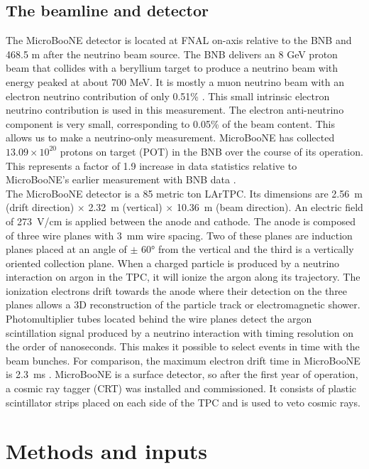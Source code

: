 \documentclass[amsmath,amssymb,aps,prd,showpacs,twocolumn,superscriptaddress,letterpaper,longbibliography, floatfix]{revtex4-2}
\begin{document}
\subsection{The beamline and detector}
The MicroBooNE detector \cite{Microboonedetector} is located at FNAL on-axis relative to the BNB and 468.5 m after the neutrino beam source. The BNB delivers an 8 GeV proton beam that collides with a beryllium target to produce a neutrino beam with energy peaked at about 700 MeV. It is mostly a muon neutrino beam with an electron neutrino contribution of only 0.51\% \cite{MiniBooNEFlux}. This small intrinsic electron neutrino contribution is used in this measurement. The electron anti-neutrino component is very small, corresponding to 0.05\% of the beam content. This allows us to make a neutrino-only measurement. MicroBooNE has collected $13.09\times10^{20}$ protons on target (POT) in the BNB over the course of its operation.  This represents a factor of 1.9 increase in data statistics relative to MicroBooNE's earlier measurement with BNB data \cite{MicroBooNEXsec}. \\

The MicroBooNE detector is a 85 metric ton LArTPC. Its dimensions are 2.56~m (drift direction) $\times$ 2.32~m (vertical) $\times$ 10.36~m (beam direction). An electric field of 273~V/cm is applied between the anode and cathode. The anode is composed of three wire planes with 3~mm wire spacing. Two of these planes are induction planes placed at an angle of $\pm$ 60° from the vertical and the third is a vertically oriented collection plane. When a charged particle is produced by a neutrino interaction on argon in the TPC, it will ionize the argon along its trajectory. The ionization electrons drift towards the anode where their detection on the three planes allows a 3D reconstruction of the particle track or electromagnetic shower. Photomultiplier tubes located behind the wire planes detect the argon scintillation signal produced by a neutrino interaction with timing resolution on the order of nanoseconds. This makes it possible to select events in time with the beam bunches. For comparison, the maximum electron drift time in MicroBooNE is 2.3~ms \cite{Drifttime2}. MicroBooNE is a surface detector, so after the first year of operation, a cosmic ray tagger (CRT) \cite{CRT_UB} was installed and commissioned. It consists of plastic scintillator strips placed on each side of the TPC and is used to veto cosmic rays.\\

\section{Methods and inputs}
\end{document}
